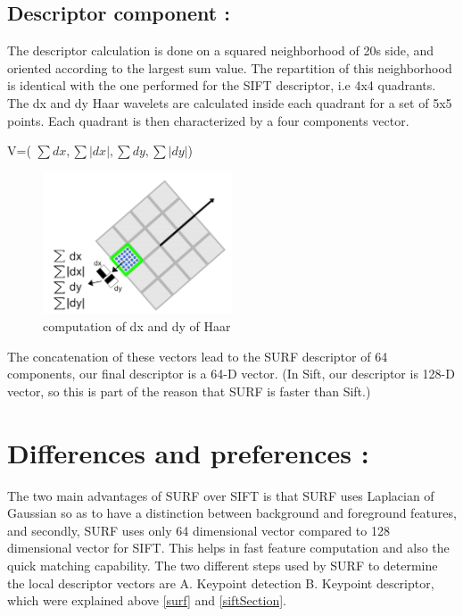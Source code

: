 \subsection {Descriptor component : }



The descriptor calculation is done on a squared neighborhood of 20s side, and oriented according to  the largest sum value. The repartition of this neighborhood is identical with the one performed for the SIFT descriptor, i.e 4x4 quadrants.  The dx and dy Haar wavelets are calculated inside each quadrant for a set of 5x5 points. Each quadrant is then characterized by a four components vector.

V=( $\sum dx , \sum \left | dx \right | ,\sum dy , \sum \left | dy \right |$)



\begin{figure}[H]
\centering
\includegraphics[width=0.5\textwidth]{img/surf5.png}
\caption{computation of dx and dy of Haar  }
\label{fig:surf5}
\end{figure}




The concatenation of these vectors lead to the SURF descriptor of 64 components,
our final descriptor is a 64-D vector. (In Sift, our descriptor is 128-D vector, so this is part of the reason that SURF is faster than Sift.)


\section{Differences and preferences :}
The two main advantages of SURF over SIFT is that SURF uses Laplacian of Gaussian so as to have a distinction
between background and foreground features, and secondly, SURF uses only 64 dimensional vector compared to 128 dimensional vector for SIFT. This helps in fast feature computation and also the quick matching capability.
The two different steps used by SURF to determine the local descriptor vectors are A. Keypoint detection B. Keypoint descriptor, which were  explained above \ref{surf} and \ref{siftSection}.

